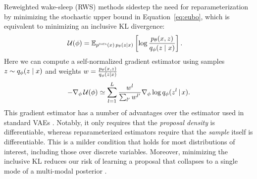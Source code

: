 \documentclass{article}
\theoremstyle{definition}
\begin{document}
Reweighted wake-sleep (RWS) methods \cite{bornschein2014reweighted} sidestep the need for reparameterization by minimizing the stochastic upper bound in Equation~\ref{eq:eubo}, which is equivalent to minimizing an inclusive KL divergence:
\begin{align}
    \label{eq:eubo}
    \mathcal{U} (\phi)
    &
    = 
    \mathbb{E}_{p^\textsc{data}(x) \, p_\theta(z \mid x)}
    \left[
       \log \frac{p_\theta(x, z)}{q_\phi(z \mid x)}
    \right]
    .
\end{align}
Here we can compute a self-normalized gradient estimator using samples $z \sim q_\phi(z \mid x)$ and weights $w = \frac{p_\theta(x, z)}{q_\phi(z \mid x)}$
\begin{align}
\label{eq:grad-phi-rws}
    - \nabla_\phi
    \,
    \mathcal{U} (\phi)
    \simeq
    \sum_{l=1}^L
    \frac{w^l}{\sum_{l'} w^{l'}}
    \nabla_\phi
    \log q_\phi(z^l \,|\, x)
    .
\end{align}
This gradient estimator has a number of advantages over the estimator used in standard VAEs \cite{le2019revisiting}. Notably, it only requires that the \emph{proposal density} is differentiable, whereas reparameterized estimators require that the \emph{sample} itself is differentiable. This is a milder condition that holds for most distributions of interest, including those over discrete variables. Moreover, minimizing the inclusive KL reduces our risk of learning a proposal that collapses to a single mode of a multi-modal posterior \cite{le2019revisiting}. 

\end{document}
